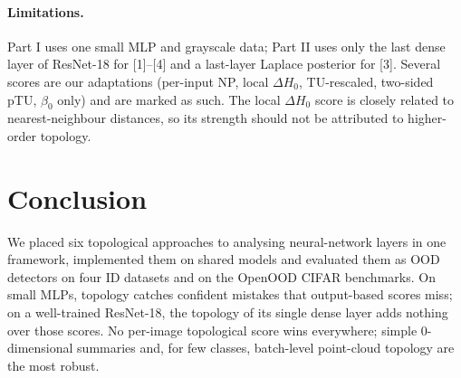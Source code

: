 \documentclass[11pt]{article}
\begin{document}
\paragraph{Limitations.} Part I uses one small MLP and grayscale data; Part II uses only the last
dense layer of ResNet-18 for [1]--[4] and a last-layer Laplace posterior for [3]. Several scores
are our adaptations (per-input NP, local $\Delta H_0$, TU-rescaled, two-sided pTU, $\beta_0$ only)
and are marked as such. The local $\Delta H_0$ score is closely related to nearest-neighbour
distances, so its strength should not be attributed to higher-order topology.

\section{Conclusion}
We placed six topological approaches to analysing neural-network layers in one framework,
implemented them on shared models and evaluated them as OOD detectors on four ID datasets and on
the OpenOOD CIFAR benchmarks. On small MLPs, topology catches confident mistakes that output-based
scores miss; on a well-trained ResNet-18, the topology of its single dense layer adds nothing over
those scores. No per-image topological score wins everywhere; simple 0-dimensional summaries and,
for few classes, batch-level point-cloud topology are the most robust.



\end{document}
